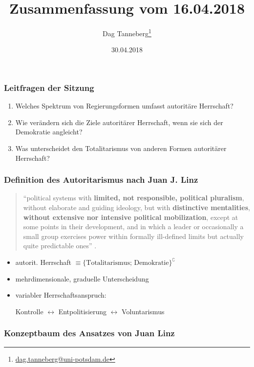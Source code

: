 \documentclass{beamer}
\title{Zusammenfassung vom 16.04.2018}
\author{Dag Tanneberg\thanks{%
  \href{mailto:dag.tanneberg@uni-potsdam.de}%
    {dag.tanneberg@uni-potsdam.de}
  }
}
\institute[Universität Potsdam]{
  {\glqq}Wie erkl\"art man autorit\"are Herrschaft?{\grqq}\\
  Universität Potsdam\\
  Lehrstuhl für Vergleichende Politikwissenschaft\\
  Sommersemester 2018
}
\date{30.04.2018}
\begin{document}
\maketitle

\begin{frame}
  \frametitle{Leitfragen der Sitzung}
  \begin{enumerate}
    \item Welches Spektrum von Regierungsformen umfasst
      autoritäre Herrschaft?
    \item Wie verändern sich die Ziele autoritärer
      Herrschaft, wenn sie sich der Demokratie angleicht?
    \item Was unterscheidet den Totalitarismus von anderen
      Formen autoritärer Herrschaft?
  \end{enumerate}
\end{frame}

\begin{frame}
  \frametitle{Definition des Autoritarismus nach Juan J. Linz}
  \begin{quote}
    \normalfont
    \small
    ``political systems with \textbf{limited, not responsible,
    political pluralism}, without elaborate and guiding
    ideology, but with \textbf{distinctive mentalities},
    \textbf{without extensive nor intensive political mobilization},
    except at some points in their development, and in which
    a leader or occasionally a small group exercises power
    within formally ill-defined limits but actually quite
    predictable ones''
    \newline \newline
    \footnotesize{}.
  \end{quote}
  \begin{itemize}
    \item autorit. Herrschaft $\equiv \{\text{Totalitarismus; Demokratie}\}^\complement$
    \item mehrdimensionale, graduelle Unterscheidung
    \item variabler Herrschaftsanspruch:

    Kontrolle $\leftrightarrow$ Entpolitisierung $\leftrightarrow$ Voluntarismus
  \end{itemize}
\end{frame}

\begin{frame}
  \frametitle{Konzeptbaum des Ansatzes von Juan Linz}
  \begin{figure}[t]
    
  \end{figure}
\end{frame}
\end{document}
